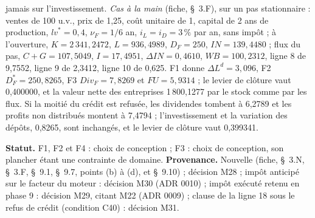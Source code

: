 \documentclass[11pt,a4paper]{article}
\begin{document}
\begin{proposee}
jamais sur l'investissement. \emph{Cas à la main} (fiche, \S~3.F), sur un pas stationnaire : ventes de 100 u.v., prix de 1,25, coût unitaire de 1, capital de 2 ans de production, $\mathit{lv}^\ast = 0{,}4$, $\nu_F = 1/6$ an, $i_L = i_D = 3\,\%$ par an, sans impôt ; à l'ouverture, $K = 2\,341{,}2472$, $L = 936{,}4989$, $D_F = 250$, $\mathit{IN} = 139{,}4480$ ; flux du pas, $C + G = 107{,}5049$, $I = 17{,}4951$, $\Delta\mathit{IN} = 0{,}4610$, $\mathit{WB} = 100{,}2312$, ligne 8 de 9,7552, ligne 9 de 2,3412, ligne 10 de 0,625. F1 donne $\Delta L^d = 3{,}096$, F2 $D^\ast_F = 250{,}8265$, F3 $\mathit{Div}_F = 7{,}8269$ et $\mathit{FU} = 5{,}9314$ ; le levier de clôture vaut 0,400000, et la valeur nette des entreprises 1\,800,1277 par le stock comme par les flux. Si la moitié du crédit est refusée, les dividendes tombent à 6,2789 et les profits non distribués montent à 7,4794 ; l'investissement et la variation des dépôts, 0,8265, sont inchangés, et le levier de clôture vaut 0,399341.

\textbf{Statut.} F1, F2 et F4 : choix de conception ; F3 : choix de conception, son plancher étant une contrainte de domaine. \textbf{Provenance.} Nouvelle (fiche, \S~3.N, \S~3.F, \S~9.1, \S~9.7, points (b) à (d), et \S~9.10) ; décision M28 ; impôt anticipé sur le facteur du moteur : décision M30 (ADR 0010) ; impôt exécuté retenu en phase 9 : décision M29, citant M22 (ADR 0009) ; clause de la ligne 18 sous le refus de crédit (condition C40) : décision M31.
\end{proposee}
\end{document}
